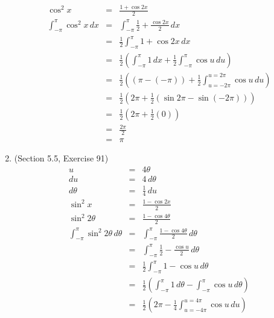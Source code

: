 \documentclass{article}
\begin{document}
\begin{enumerate}
\begin{eqnarray}
            \cos^2{x} &=& \frac{1 + \cos{2x}}{2} \\
            \int_{-\pi}^{\pi}{\cos^2{x}\,dx} &=& \int_{-\pi}^{\pi}{\frac{1}{2} + \frac{\cos{2x}}{2}\,dx} \\
                                             &=& \frac{1}{2}\int_{-\pi}^{\pi}{1 + \cos{2x}\,dx} \\
                                             &=& \frac{1}{2}\left(\int_{-\pi}^{\pi}{1\,dx} + \frac{1}{2}\int_{-\pi}^{\pi}{\cos{u}\,du}\right) \\
                                             &=& \frac{1}{2}\left(\left(\pi - \left(-\pi\right)\right) + \frac{1}{2}\int_{u = -2\pi}^{u = 2\pi}{\cos{u}\,du}\right) \\
                                             &=& \frac{1}{2}\left(2\pi + \frac{1}{2}\left(\sin{2\pi} - \sin{\left(-2\pi\right)}\right)\right) \\
                                             &=& \frac{1}{2}\left(2\pi + \frac{1}{2}\left(0\right)\right) \\
                                             &=& \frac{2\pi}{2} \\
                                             &=& \pi
        \end{eqnarray}
    \item (Section 5.5, Exercise 91)
        \begin{eqnarray}
            u &=& 4\theta \\
            du &=& 4\,d\theta \\
            d\theta &=& \frac{1}{4}\,du \\
            \sin^2{x} &=& \frac{1 - \cos{2x}}{2} \\
            \sin^2{2\theta} &=& \frac{1 - \cos{4\theta}}{2} \\
            \int_{-\pi}^{\pi}{\sin^2{2\theta}\,d\theta} &=& \int_{-\pi}^{\pi}{\frac{1 - \cos{4\theta}}{2}\,d\theta} \\
                                                        &=& \int_{-\pi}^{\pi}{\frac{1}{2} - \frac{\cos{u}}{2}\,d\theta} \\
                                                        &=& \frac{1}{2}\int_{-\pi}^{\pi}{1 - \cos{u}\,d\theta} \\
                                                        &=& \frac{1}{2}\left(\int_{-\pi}^{\pi}{1\,d\theta} - \int_{-\pi}^{\pi}{\cos{u}\,d\theta}\right) \\
                                                        &=& \frac{1}{2}\left(2\pi - \frac{1}{4}\int_{u = -4\pi}^{u = 4\pi}{\cos{u}\,du}\right) \\

\end{eqnarray}
\end{enumerate}
\end{document}
